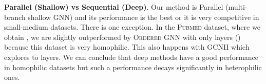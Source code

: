 \documentclass{article}
\theoremstyle{plain}
\theoremstyle{definition}
\begin{document}
\textbf{Parallel (Shallow) vs Sequential (Deep)}. Our method is Parallel (multi-branch shallow GNN) and its performance is the best or it is very competitive in small-medium datasets. There is one exception. In the \textsc{Pubmed} dataset, where we obtain , we are slightly outperformed by \textsc{Ordered GNN} with only  layers () because this dataset is very homophilic. This also happens with \textsc{GCNII} which explores  to  layers. We can conclude that deep methods have a good performance in homophilic datasets but such a performance decays significantly in heterophilic ones. 
\begin{table*}[ht]
\caption{Node-classification accuracies in large graphs. Top three models are coloured by \textcolor{red}{ \textbf{First}}, \textcolor{blue}{ \textbf{Second}}, \textcolor{violet}{ \textbf{Third}}.}
\label{tab:results_large}
\begin{center}
\begin{small}
\begin{sc}
\end{sc}
\end{small}
\end{center}
\end{table*}
\end{document}
